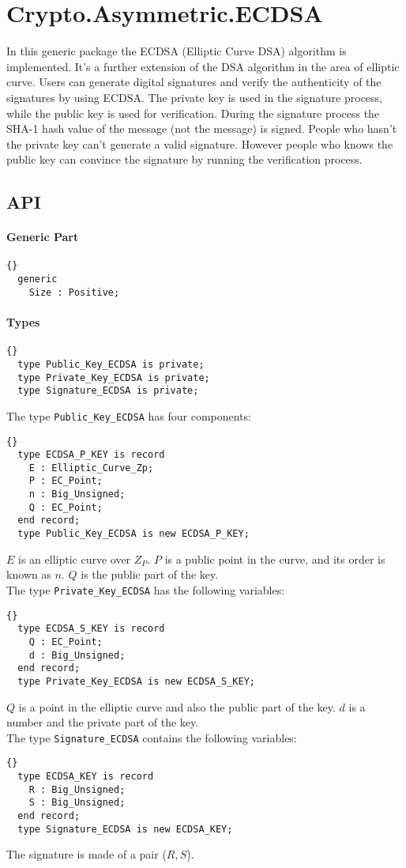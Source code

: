 \chapter{Crypto.Asymmetric.ECDSA}
In this generic package the ECDSA (Elliptic Curve DSA) algorithm is implemented. It's a further extension of the DSA algorithm in the area of elliptic curve. Users can generate digital signatures and verify the authenticity of the signatures by using ECDSA. The private key is used in the signature process, while the public key is used for verification. During the signature process the SHA-1 hash value of the message (not the message) is signed. People who hasn't the private key can't generate a valid signature. However people who knows the public key can convince the signature by running the verification process.
\section{API}
\subsubsection*{Generic Part}
\begin{lstlisting}{}
  generic
    Size : Positive;
\end{lstlisting}
\subsubsection*{Types}
\begin{lstlisting}{}
  type Public_Key_ECDSA is private;
  type Private_Key_ECDSA is private;
  type Signature_ECDSA is private;
\end{lstlisting}
The type \texttt{Public\_Key\_ECDSA} has four components:
\begin{lstlisting}{}
  type ECDSA_P_KEY is record
    E : Elliptic_Curve_Zp;
    P : EC_Point; 
    n : Big_Unsigned;
    Q : EC_Point; 
  end record;
  type Public_Key_ECDSA is new ECDSA_P_KEY;
\end{lstlisting}
$E$ is an elliptic curve over $Z_P$. $P$ is a public point in the curve, and its order is known as $n$. $Q$ is the public part of the key. \\
The type \texttt{Private\_Key\_ECDSA} has the following variables:
\begin{lstlisting}{}
  type ECDSA_S_KEY is record
    Q : EC_Point; 
    d : Big_Unsigned;
  end record;
  type Private_Key_ECDSA is new ECDSA_S_KEY;
\end{lstlisting}
$Q$ is a point in the elliptic curve and also the public part of the key. $d$ is a number and the private part of the key.\\
The type \texttt{Signature\_ECDSA} contains the following variables:
\begin{lstlisting}{}
  type ECDSA_KEY is record
    R : Big_Unsigned;
    S : Big_Unsigned;
  end record;
  type Signature_ECDSA is new ECDSA_KEY;
\end{lstlisting}
The signature is made of a pair ($R,S$).\\
